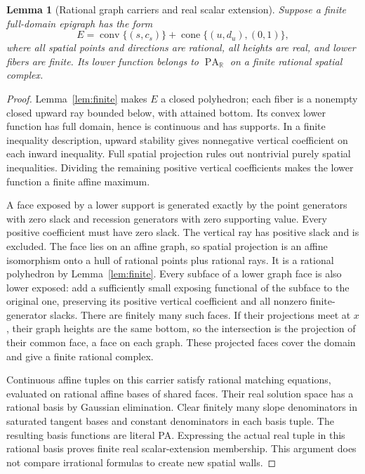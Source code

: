 \documentclass[11pt]{article}
\newtheorem{lemma}[theorem]{Lemma}
\newcommand{\R}{\mathbb R}
\newcommand{\PA}{\operatorname{PA}}
\newcommand{\conv}{\operatorname{conv}}
\newcommand{\cone}{\operatorname{cone}}
\begin{document}
\begin{lemma}[Rational graph carriers and real scalar extension]\label{lem:graph}
Suppose a finite full-domain epigraph has the form
\[
E=\conv\{(s,c_s)\}+\cone\{(u,d_u),(0,1)\},
\]
where all spatial points and directions are rational, all heights are real, and lower fibers are finite. Its lower function belongs to $\PA_\R$ on a finite rational spatial complex.
\end{lemma}
\begin{proof}
Lemma~\ref{lem:finite} makes $E$ a closed polyhedron; each fiber is a nonempty closed upward ray bounded below, with attained bottom. Its convex lower function has full domain, hence is continuous and has supports. In a finite inequality description, upward stability gives nonnegative vertical coefficient on each inward inequality. Full spatial projection rules out nontrivial purely spatial inequalities. Dividing the remaining positive vertical coefficients makes the lower function a finite affine maximum.

A face exposed by a lower support is generated exactly by the point generators with zero slack and recession generators with zero supporting value. Every positive coefficient must have zero slack. The vertical ray has positive slack and is excluded. The face lies on an affine graph, so spatial projection is an affine isomorphism onto a hull of rational points plus rational rays. It is a rational polyhedron by Lemma~\ref{lem:finite}. Every subface of a lower graph face is also lower exposed: add a sufficiently small exposing functional of the subface to the original one, preserving its positive vertical coefficient and all nonzero finite-generator slacks. There are finitely many such faces. If their projections meet at $x$, their graph heights are the same bottom, so the intersection is the projection of their common face, a face on each graph. These projected faces cover the domain and give a finite rational complex.

Continuous affine tuples on this carrier satisfy rational matching equations, evaluated on rational affine bases of shared faces. Their real solution space has a rational basis by Gaussian elimination. Clear finitely many slope denominators in saturated tangent bases and constant denominators in each basis tuple. The resulting basis functions are literal PA. Expressing the actual real tuple in this rational basis proves finite real scalar-extension membership. This argument does not compare irrational formulas to create new spatial walls.
\end{proof}
\end{document}
